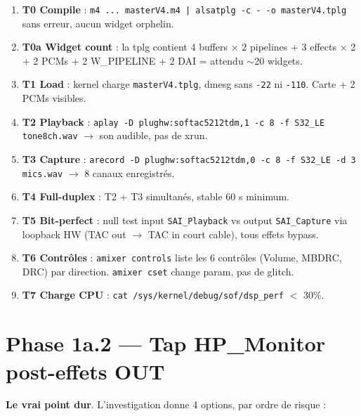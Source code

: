 \documentclass[11pt,a4paper]{article}
\begin{document}
\begin{enumerate}[leftmargin=*, itemsep=2pt]
  \item \textbf{T0 Compile} : \texttt{m4 ... masterV4.m4 | alsatplg -c - -o masterV4.tplg} sans erreur, aucun widget orphelin.
  \item \textbf{T0a Widget count} : la tplg contient 4 buffers $\times$ 2 pipelines + 3 effects $\times$ 2 + 2 PCMs + 2 W\_PIPELINE + 2 DAI = attendu $\sim$20 widgets.
  \item \textbf{T1 Load} : kernel charge \texttt{masterV4.tplg}, dmesg sans \texttt{-22} ni \texttt{-110}. Carte + 2 PCMs visibles.
  \item \textbf{T2 Playback} : \texttt{aplay -D plughw:softac5212tdm,1 -c 8 -f S32\_LE tone8ch.wav} $\to$ son audible, pas de xrun.
  \item \textbf{T3 Capture} : \texttt{arecord -D plughw:softac5212tdm,0 -c 8 -f S32\_LE -d 3 mics.wav} $\to$ 8 canaux enregistrés.
  \item \textbf{T4 Full-duplex} : T2 + T3 simultanés, stable 60 s minimum.
  \item \textbf{T5 Bit-perfect} : null test input \texttt{SAI\_Playback} vs output \texttt{SAI\_Capture} via loopback HW (TAC out $\to$ TAC in court cable), tous effets bypass.
  \item \textbf{T6 Contrôles} : \texttt{amixer controls} liste les 6 contrôles (Volume, MBDRC, DRC) par direction. \texttt{amixer cset} change param, pas de glitch.
  \item \textbf{T7 Charge CPU} : \texttt{cat /sys/kernel/debug/sof/dsp\_perf} $<$ 30\%.
\end{enumerate}

\section{Phase 1a.2 --- Tap HP\_Monitor post-effets OUT}\label{sec:tap}

\textbf{Le vrai point dur}. L'investigation donne 4 options, par ordre de risque :
\end{document}
